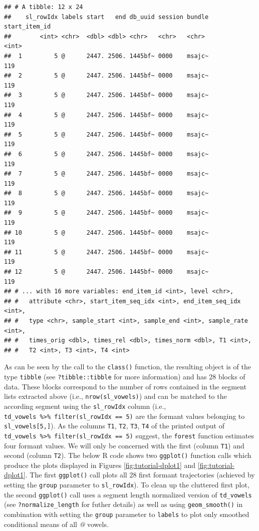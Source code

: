 \documentclass[]{book}
\begin{document}
\begin{verbatim}
## # A tibble: 12 x 24
##    sl_rowIdx labels start   end db_uuid session bundle start_item_id
##        <int> <chr>  <dbl> <dbl> <chr>   <chr>   <chr>          <int>
##  1         5 @      2447. 2506. 1445bf~ 0000    msajc~           119
##  2         5 @      2447. 2506. 1445bf~ 0000    msajc~           119
##  3         5 @      2447. 2506. 1445bf~ 0000    msajc~           119
##  4         5 @      2447. 2506. 1445bf~ 0000    msajc~           119
##  5         5 @      2447. 2506. 1445bf~ 0000    msajc~           119
##  6         5 @      2447. 2506. 1445bf~ 0000    msajc~           119
##  7         5 @      2447. 2506. 1445bf~ 0000    msajc~           119
##  8         5 @      2447. 2506. 1445bf~ 0000    msajc~           119
##  9         5 @      2447. 2506. 1445bf~ 0000    msajc~           119
## 10         5 @      2447. 2506. 1445bf~ 0000    msajc~           119
## 11         5 @      2447. 2506. 1445bf~ 0000    msajc~           119
## 12         5 @      2447. 2506. 1445bf~ 0000    msajc~           119
## # ... with 16 more variables: end_item_id <int>, level <chr>,
## #   attribute <chr>, start_item_seq_idx <int>, end_item_seq_idx <int>,
## #   type <chr>, sample_start <int>, sample_end <int>, sample_rate <int>,
## #   times_orig <dbl>, times_rel <dbl>, times_norm <dbl>, T1 <int>,
## #   T2 <int>, T3 <int>, T4 <int>
\end{verbatim}

As can be seen by the call to the \texttt{class()} function, the resulting object is of the type \texttt{tibble} (see \texttt{?tibble::tibble} for more information) and has 28 blocks of data. These blocks correspond to the number of rows contained in the segment lists extracted above (i.e., \texttt{nrow(sl\_vowels)}) and can be matched to the according segment using the \texttt{sl\_rowIdx} column (i.e., \texttt{td\_vowels\ \%\textgreater{}\%\ filter(sl\_rowIdx\ ==\ 5)} are the formant values belonging to \texttt{sl\_vowels{[}5,{]}}). As the columns \texttt{T1}, \texttt{T2}, \texttt{T3}, \texttt{T4} of the printed output of \texttt{td\_vowels\ \%\textgreater{}\%\ filter(sl\_rowIdx\ ==\ 5)} suggest, the \texttt{forest} function estimates four formant values. We will only be concerned with the first (column \texttt{T1}) and second (column \texttt{T2}). The below R code shows two \texttt{ggplot()} function calls which produce the plots displayed in Figures \ref{fig:tutorial-dplot1} and \ref{fig:tutorial-dplot1}. The first \texttt{ggplot()} call plots all 28 first formant trajectories (achieved by setting the \texttt{group} parameter to \texttt{sl\_rowIdx}). To clean up the cluttered first plot, the second \texttt{ggplot()} call uses a segment length normalized version of \texttt{td\_vowels} (see \texttt{?normalize\_length} for futher details) as well as using \texttt{geom\_smooth()} in combination with setting the \texttt{group} parameter to \texttt{labels} to plot only smoothed conditional means of all \emph{@} vowels.
\end{document}
